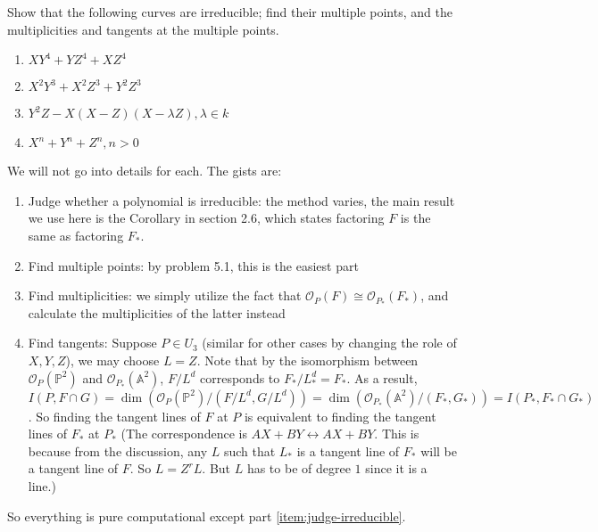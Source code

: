 \documentclass{solution}
\begin{document}
\begin{problem}{5.2}
    Show that the following curves are irreducible; find their multiple points, and the multiplicities and tangents at the multiple points.

    \begin{enumerate}
        \item $XY^4 + YZ^4 + XZ^4$
        \item $X^2Y^3 + X^2Z^3 + Y^2Z^3$
        \item $Y^2Z - X(X - Z)(X - \lambda Z), \lambda \in k$
        \item $X^n + Y^n + Z^n, n \gt 0$
    \end{enumerate}
\end{problem}

\begin{solution}
    We will not go into details for each. The gists are:

    \begin{enumerate}
        \item \label{item:judge-irreducible} Judge whether a polynomial is irreducible: the method varies, the main result we use here is the Corollary in section 2.6, which states factoring $F$ is the same as factoring $F_*$.
        \item Find multiple points: by problem 5.1, this is the easiest part
        \item Find multiplicities: we simply utilize the fact that $\mathcal{O}_{P}(F) \cong \mathcal{O}_{P_*}(F_*)$, and calculate the multiplicities of the latter instead
        \item Find tangents: Suppose $P \in U_3$ (similar for other cases by changing the role of $X, Y, Z$), we may choose $L = Z$. Note that by the isomorphism between $\mathcal{O}_{P}(\mathbb{P}^2)$ and $\mathcal{O}_{P_*}(\mathbb{A}^2)$, $F / L^d$ corresponds to $F_* / L_*^d = F_*$. As a result, $I(P, F \cap G) = \dim (\mathcal{O}_{P}(\mathbb{P}^2) / (F / L^d, G / L^d)) = \dim (\mathcal{O}_{P_*}(\mathbb{A}^2) / (F_*, G_*)) = I(P_*, F_* \cap G_*)$. So finding the tangent lines of $F$ at $P$ is equivalent to finding the tangent lines of $F_*$ at $P_*$ (The correspondence is $AX + BY \leftrightarrow AX + BY$. This is because from the discussion, any $L$ such that $L_*$ is a tangent line of $F_*$ will be a tangent line of $F$. So $L = Z^rL$. But $L$ has to be of degree $1$ since it is a line.)
    \end{enumerate}

    So everything is pure computational except part \ref{item:judge-irreducible}.


\end{solution}
\end{document}
